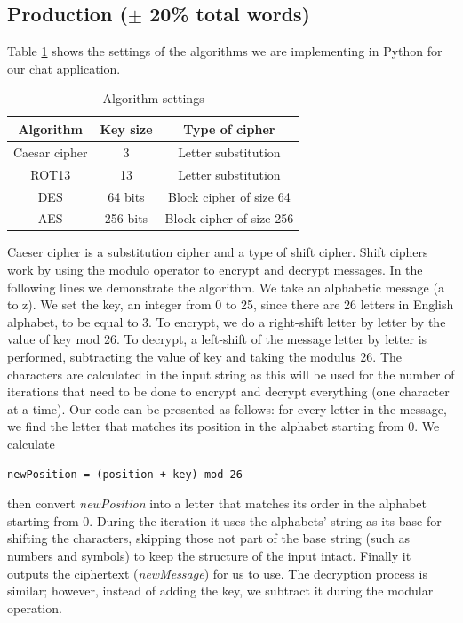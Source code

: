 \subsection{Production ($\pm$ 20\% total words)}

Table \ref{algorithms} shows the settings of the algorithms we are implementing in Python for our chat application.

\begin{table}[h!]
\begin{tabular}{|c|c|c|}
\hline
\textbf{Algorithm} & \textbf{Key size} & \textbf{Type of cipher}  \\ \hline
Caesar cipher      & 3                 & Letter substitution      \\ \hline
ROT13              & 13                & Letter substitution      \\ \hline
DES                & 64 bits           & Block cipher of size 64  \\ \hline
AES                & 256 bits          & Block cipher of size 256 \\ \hline
\end{tabular}
\caption{Algorithm settings}
\label{algorithms}
\end{table}

Caeser cipher is a substitution cipher and a type of shift cipher. Shift ciphers work by using the modulo operator to encrypt and decrypt messages. In the following lines we demonstrate the algorithm. We take an alphabetic message (a to z). We set the key, an integer from 0 to 25, since there are 26 letters in English alphabet, to be equal to 3. To encrypt, we do a right-shift letter by letter by the value of key mod 26. To decrypt, a left-shift of the message letter by letter is performed, subtracting the value of key and taking the modulus 26. The characters are calculated in the input string as this will be used for the number of iterations that need to be done to encrypt and decrypt everything (one character at a time). Our code can be presented as follows: for every letter in the message, we find the letter that matches its position in the alphabet starting from 0. We calculate
\begin{verbatim}
newPosition = (position + key) mod 26
\end{verbatim} 
then convert \textit{newPosition} into a letter that matches its order in the alphabet starting from 0. During the iteration it uses the alphabets' string as its base for shifting the characters, skipping those not part of the base string (such as numbers and symbols) to keep the structure of the input intact.
Finally it outputs the ciphertext (\textit{newMessage}) for us to use. The decryption process is similar; however, instead of adding the key, we subtract it during the modular operation.

